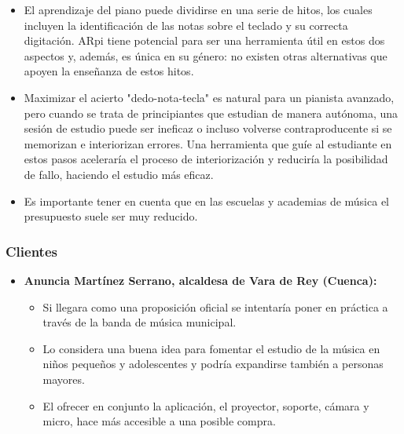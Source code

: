 \begin{itemize}
	\begin{itemize}
		\item El aprendizaje del piano puede dividirse en una serie de hitos, los cuales incluyen la
		identificación de las notas sobre el teclado y su correcta digitación. ARpi tiene potencial para
		ser una herramienta útil en estos dos aspectos y, además, es única en su género: no existen otras
		alternativas que apoyen la enseñanza de estos hitos.
		\item Maximizar el acierto "dedo-nota-tecla" es natural para un pianista avanzado, pero cuando se trata de 
		principiantes que estudian de manera autónoma, una sesión de estudio puede ser ineficaz o incluso volverse 
		contraproducente si se memorizan e interiorizan errores. Una herramienta que guíe al estudiante en 
		estos pasos aceleraría el proceso de interiorización y reduciría la posibilidad de fallo, haciendo el estudio más eficaz.
		\item Es importante tener en cuenta que en las escuelas y academias de música el presupuesto suele ser muy reducido. 
	\end{itemize}
\end{itemize}

\pagebreak
\subsubsection{Clientes}

\begin{itemize}
	\item \textbf{Anuncia Martínez Serrano, alcaldesa de Vara de Rey (Cuenca):}
	\begin{itemize}
		\item Si llegara como una proposición oficial se intentaría poner en práctica
		a través de la banda de música municipal.
		\item Lo considera una buena idea para fomentar el estudio de la música
		en niños pequeños y adolescentes y podría expandirse también a personas mayores.
		\item El ofrecer en conjunto la aplicación, el proyector, soporte, cámara y micro,
		hace más accesible a una posible compra.
	\end{itemize}
\end{itemize}

